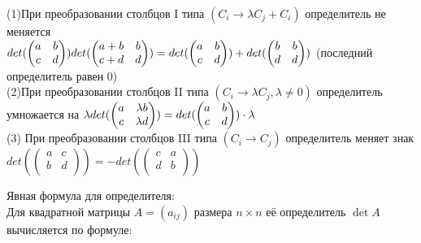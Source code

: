 \documentclass[12pt, oneside]{book}
\theoremstyle{definition}
\begin{document}
\begin{enumerate}
(1)При преобразовании столбцов I типа $(C_i \longrightarrow \lambda C_j + C_i)$ определитель не меняется\\
$det(\begin{pmatrix}
a & b\\
c & d\\
\end{pmatrix})\\
det(\begin{pmatrix}
a+b & b\\
c+d & d\\
\end{pmatrix}) = det(\begin{pmatrix}
a & b\\
c & d\\
\end{pmatrix}) + det(\begin{pmatrix}
b & b\\ 
d & d\\
\end{pmatrix})$ (последний определитель равен 0)\\
(2)При преобразовании столбцов II типа $(C_i \longrightarrow \lambda C_j, \lambda \neq 0)$ определитель умножается на $\lambda\\
det(\begin{pmatrix}
a & \lambda b\\
c & \lambda d\\
\end{pmatrix}) = det(\begin{pmatrix}
a & b\\ 
c & d\\
\end{pmatrix}) \cdot \lambda$\\
(3) При преобразовании столбцов III типа $(C_i \longrightarrow C_j)$ определитель меняет знак\\
$det(\begin{pmatrix}
a & c\\
b & d\\
\end{pmatrix}) = - det (\begin{pmatrix}
c & a\\
d & b\\
\end{pmatrix})$

Явная формула для определителя: \\
Для квадратной матрицы  $A=(a_{ij}) $ размера  $n\times n$  её определитель $\det A$ вычисляется по формуле:


\end{enumerate}
\end{document}
